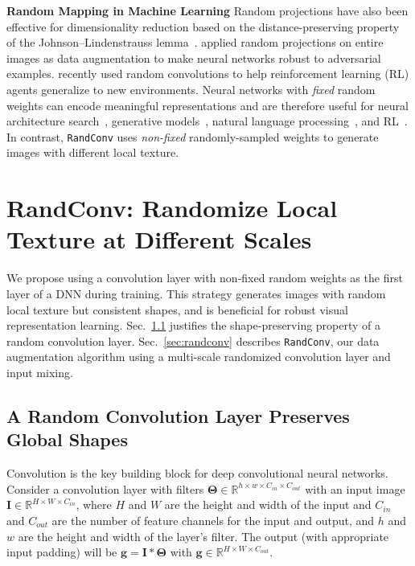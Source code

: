 \documentclass{article} \usepackage{iclr2021_conference,times}
\newcommand{\RandConv}{\texttt{RandConv}}
\begin{document}
\textbf{Random Mapping in Machine Learning}
Random projections have also been effective for dimensionality reduction based on the distance-preserving property of the Johnson–Lindenstrauss lemma~\citep{johnson1984extensions}. \citep{vinh2016training} applied random projections on entire images as data augmentation to make neural networks robust to adversarial examples. \citet{lee2020network} recently used random convolutions to help reinforcement learning (RL) agents generalize to new environments. Neural networks with \textit{fixed} random weights can encode meaningful representations \citep{saxe2011random} and are therefore useful for neural architecture search~\citep{gaier2019weight}, generative models~\citep{he2016powerful}, natural language processing~\citep{wieting2018no}, and RL~\citep{osband2018randomized, burda2018exploration}. In contrast, {\RandConv} uses \textit{non-fixed} randomly-sampled weights to generate images with different local texture.

\section{RandConv: Randomize Local Texture at Different Scales }

We propose using a convolution layer with non-fixed random weights as the first layer of a DNN during training. This strategy generates images with random local texture but consistent shapes, and is beneficial for robust visual representation learning. Sec.~\ref{sec:rc_shape_preserve} justifies the shape-preserving property of a random convolution layer. 
Sec.~\ref{sec:randconv} describes {\RandConv}, our data augmentation algorithm using a multi-scale randomized convolution layer and input mixing.

\subsection{A Random Convolution Layer Preserves Global Shapes}
\label{sec:rc_shape_preserve}
Convolution is the key building block for deep convolutional neural networks.
Consider a convolution layer with filters $\mathbf{\Theta}\in\mathbb{R}^{h\times w \times C_{in}\times C_{out}}$ with an input image $\mathbf{I}\in\mathbb{R}^{H\times W\times C_{in}}$, where $H$ and $W$ are the height and width of the input and $C_{in}$ and $C_{out}$ are the number of feature channels for the input and output, and $h$ and $w$ are the height and width of the layer's filter. The output (with appropriate input padding) will be $\mathbf{g} = \mathbf{I} *  \mathbf{\Theta}$ with $\mathbf{g}\in\mathbb{R}^{H\times W\times C_{out}}$.  
\end{document}
